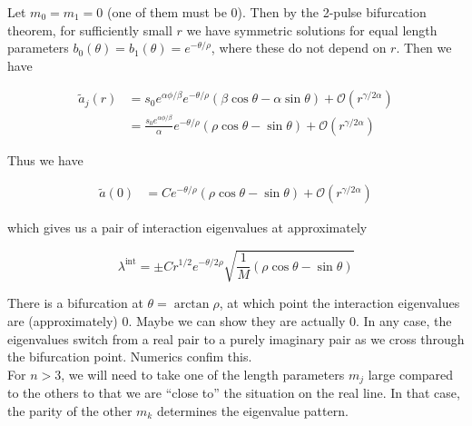 \documentclass[12pt]{article}
\begin{document}
Let $m_0 = m_1 = 0$ (one of them must be 0). Then by the 2-pulse bifurcation theorem, for sufficiently small $r$ we have symmetric solutions for equal length parameters $b_0(\theta) = b_1(\theta) = e^{-\theta/\rho}$, where these do not depend on $r$. Then we have

\begin{align*}
\tilde{a}_j(r)
&= s_0 e^{\alpha \phi/\beta} e^{-\theta/\rho} \left( \beta \cos \theta - \alpha \sin \theta \right) + \mathcal{O}(r^{\gamma/2\alpha})\\
&= \frac{s_0 e^{\alpha \phi/\beta} }{\alpha}  e^{-\theta/\rho} \left( \rho \cos \theta - \sin \theta \right) + \mathcal{O}(r^{\gamma/2\alpha})
\end{align*}

Thus we have

\begin{align*}
\tilde{a}(0) &= C e^{-\theta/\rho} \left( \rho \cos \theta - \sin \theta \right) + \mathcal{O}(r^{\gamma/2\alpha})
\end{align*}

which gives us a pair of interaction eigenvalues at approximately

\[
\lambda^{\text{int}} = \pm C r^{1/2} e^{-\theta/2\rho} \sqrt{ \frac{1}{M} \left( \rho \cos \theta - \sin \theta \right) }
\]

There is a bifurcation at $\theta = \arctan \rho$, at which point the interaction eigenvalues are (approximately) 0. Maybe we can show they are actually 0. In any case, the eigenvalues switch from a real pair to a purely imaginary pair as we cross through the bifurcation point. Numerics confim this.\\

For $n > 3$, we will need to take one of the length parameters $m_j$ large compared to the others to that we are ``close to'' the situation on the real line. In that case, the parity of the other $m_k$ determines the eigenvalue pattern.

\end{document}
